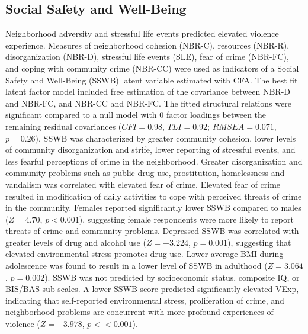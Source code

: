 \documentclass[utf8]{article}
\begin{document}
\subsection{Social Safety and Well-Being} Neighborhood adversity and stressful life events predicted elevated violence experience. Measures of neighborhood cohesion (NBR-C), resources (NBR-R), disorganization (NBR-D), stressful life events (SLE), fear of crime (NBR-FC), and coping with community crime (NBR-CC) were used as indicators of a Social Safety and Well-Being (SSWB) latent variable estimated with CFA. The best fit latent factor model included free estimation of the covariance between NBR-D and NBR-FC, and NBR-CC and NBR-FC. The fitted structural relations were significant compared to a null model with $0$ factor loadings between the remaining residual covariances ($CFI=0.98$, $TLI=0.92$; $RMSEA=0.071$, $p=0.26$). SSWB was characterized by greater community cohesion, lower levels of community disorganization and strife, lower reporting of stressful events, and less fearful perceptions of crime in the neighborhood. Greater disorganization and community problems such as public drug use, prostitution, homelessness and vandalism was correlated with elevated fear of crime. Elevated fear of crime resulted in modification of daily activities to cope with perceived threats of crime in the community. Females reported significantly lower SSWB compared to males ($Z=4.70$, $p<0.001$), suggesting female respondents were more likely to report threats of crime and community problems. Depressed SSWB was correlated with greater levels of drug and alcohol use ($Z=-3.224$, $p=0.001$), suggesting that elevated environmental stress promotes drug use. Lower average BMI during adolescence was found to result in a lower level of SSWB in adulthood ($Z=3.064$, $p=0.002$). SSWB was not predicted by socioeconomic status, composite IQ, or BIS/BAS sub-scales. A lower SSWB score predicted significantly elevated VExp, indicating that self-reported environmental stress, proliferation of crime, and neighborhood problems are concurrent with more profound experiences of violence ($Z=-3.978$, $p<<0.001$). 
\end{document}
